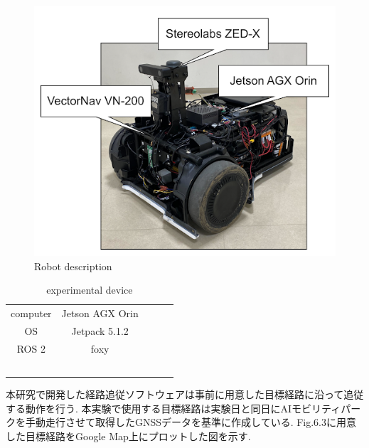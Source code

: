 \begin{figure}[H]
     \centering
    \includegraphics[keepaspectratio, scale=0.6]
         {images/robotdescription.png}
    \caption{Robot description}
    \label{fig:robot}
\end{figure}

\begin{table}[H]
     \centering
     \caption{experimental device}
     \begin{tabular}{cclll}
     \cline{1-2}
     computer             & Jetson AGX Orin &  &  &  \\
     OS                   & Jetpack 5.1.2   &  &  &  \\
     ROS 2                & foxy            &  &  &  \\
                          &                 &  &  &  \\
                          &                 &  &  &  \\
                          &                 &  &  &  \\
     \multicolumn{1}{l}{} &                 &  &  &  \\
     \multicolumn{1}{l}{} &                 &  &  & 
     \end{tabular}
\end{table}

本研究で開発した経路追従ソフトウェアは事前に用意した目標経路に沿って追従する動作を行う.
本実験で使用する目標経路は実験日と同日にAIモビリティパークを手動走行させて取得したGNSSデータを基準に作成している.
Fig.6.3に用意した目標経路をGoogle Map上にプロットした図を示す.

